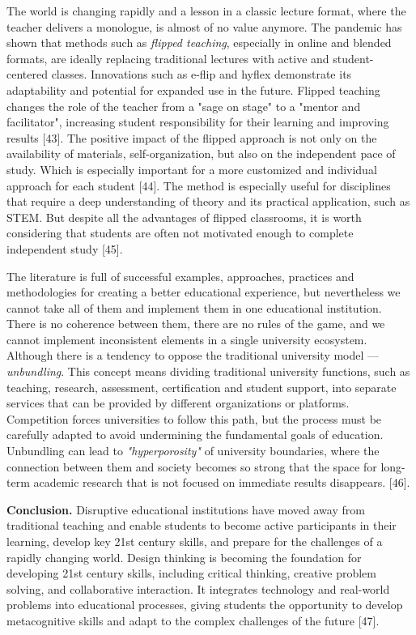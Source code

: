 The world is changing rapidly and a lesson in a classic lecture format,
where the teacher delivers a monologue, is almost of no value anymore.
The pandemic has shown that methods such as \emph{flipped teaching},
especially in online and blended formats, are ideally replacing
traditional lectures with active and student-centered classes.
Innovations such as e-flip and hyflex demonstrate its adaptability and
potential for expanded use in the future. Flipped teaching changes the
role of the teacher from a "sage on stage" to a "mentor and
facilitator", increasing student responsibility for their learning and
improving results {[}43{]}. The positive impact of the flipped approach
is not only on the availability of materials, self-organization, but
also on the independent pace of study. Which is especially important for
a more customized and individual approach for each student {[}44{]}. The
method is especially useful for disciplines that require a deep
understanding of theory and its practical application, such as STEM. But
despite all the advantages of flipped classrooms, it is worth
considering that students are often not motivated enough to complete
independent study {[}45{]}.

The literature is full of successful examples, approaches, practices and
methodologies for creating a better educational experience, but
nevertheless we cannot take all of them and implement them in one
educational institution. There is no coherence between them, there are
no rules of the game, and we cannot implement inconsistent elements in a
single university ecosystem. Although there is a tendency to oppose the
traditional university model --- \emph{unbundling}. This concept means
dividing traditional university functions, such as teaching, research,
assessment, certification and student support, into separate services
that can be provided by different organizations or platforms.
Competition forces universities to follow this path, but the process
must be carefully adapted to avoid undermining the fundamental goals of
education. Unbundling can lead to \emph{"hyperporosity"} of university
boundaries, where the connection between them and society becomes so
strong that the space for long-term academic research that is not
focused on immediate results disappears. {[}46{]}.

{\bfseries Conclusion.} Disruptive educational institutions have moved away
from traditional teaching and enable students to become active
participants in their learning, develop key 21st century skills, and
prepare for the challenges of a rapidly changing world. Design thinking
is becoming the foundation for developing 21st century skills, including
critical thinking, creative problem solving, and collaborative
interaction. It integrates technology and real-world problems into
educational processes, giving students the opportunity to develop
metacognitive skills and adapt to the complex challenges of the future
{[}47{]}.

